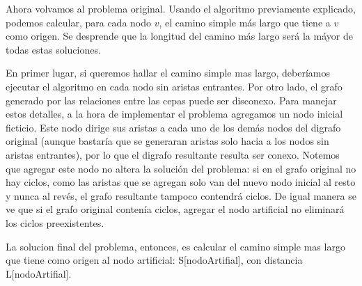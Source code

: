 Ahora volvamos al problema original. 
Usando el algoritmo previamente explicado, podemos calcular, para cada nodo $v$, el camino simple m\'as largo que tiene a $v$ como origen.
Se desprende que la longitud del camino m\'as largo ser\'a la m\'ayor de todas estas soluciones.

En primer lugar, si queremos hallar el camino simple mas largo, deber\'iamos ejecutar el algoritmo en cada nodo sin aristas entrantes. Por otro lado, el grafo generado por las relaciones entre las cepas puede ser disconexo. 
Para manejar estos detalles, a la hora de implementar el problema agregamos un nodo inicial ficticio. Este nodo dirige sus aristas a cada uno de los demás nodos del digrafo original (aunque bastar\'ia que se generaran aristas solo hacia a los nodos sin aristas entrantes), por lo que el digrafo resultante resulta ser conexo. 
Notemos que agregar este nodo no altera la solución del problema: si en el grafo original no hay ciclos, como las aristas que se agregan solo van del nuevo nodo inicial al resto y nunca al rev\'es, el grafo resultante tampoco contendr\'a ciclos. De igual manera se ve que si el grafo original conten\'ia ciclos, agregar el nodo artificial no eliminar\'a los ciclos preexistentes. 

La solucion final del problema, entonces, es calcular el camino simple mas largo que tiene como origen al nodo artificial: S[nodoArtifial], con distancia L[nodoArtifial].



